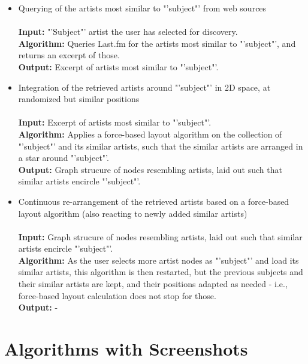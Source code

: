 \begin{itemize}
	\item Querying of the artists most similar to "'subject"' from web sources \\\\
				\textbf{Input:} "'Subject"' artist the user has selected for discovery. \\
				\textbf{Algorithm:} Queries Last.fm for the artists most similar to "'subject"', and returns
				an excerpt of those. \\
				\textbf{Output:} Excerpt of artists most similar to "'subject"'. \\
	\item Integration of the retrieved artists around "'subject"' in 2D space, at randomized but similar positions \\\\
				\textbf{Input:} Excerpt of artists most similar to "'subject"'. \\
				\textbf{Algorithm:} Applies a force-based layout algorithm on the collection of "'subject"' and
				its similar artists, such that the similar artists are arranged in a star around "'subject"'. \\
				\textbf{Output:} Graph strucure of nodes resembling artists, laid out such that similar
				artists encircle "'subject"'. \\
	\item Continuous re-arrangement of the retrieved artists based on a force-based layout algorithm (also reacting to newly added similar artists) \\\\
				\textbf{Input:} Graph strucure of nodes resembling artists, laid out such that similar
				artists encircle "'subject"'. \\
				\textbf{Algorithm:} As the user selects more artist nodes as "'subject"' and load
				its similar artists, this algorithm is then restarted, but the previous subjects and their
				similar artists are kept, and their positions adapted as needed - i.e., force-based layout
				calculation does not stop for those. \\
				\textbf{Output:} - \\
\end{itemize}

\section{Algorithms with Screenshots}

